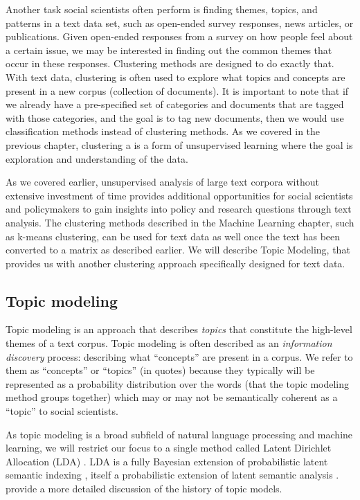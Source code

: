 \documentclass[]{krantz}
\begin{document}
Another task social scientists often perform is finding themes, topics,
and patterns in a text data set, such as open-ended survey responses,
news articles, or publications. Given open-ended responses from a survey
on how people feel about a certain issue, we may be interested in
finding out the common themes that occur in these responses. Clustering
methods are designed to do exactly that. With text data, clustering is
often used to explore what topics and concepts are present in a new
corpus (collection of documents). It is important to note that if we
already have a pre-specified set of categories and documents that are
tagged with those categories, and the goal is to tag new documents, then
we would use classification methods instead of clustering methods. As we
covered in the previous chapter, clustering a is a form of unsupervised
learning where the goal is exploration and understanding of the data.

As we covered earlier, unsupervised analysis of large text corpora
without extensive investment of time provides additional opportunities
for social scientists and policymakers to gain insights into policy and
research questions through text analysis. The clustering methods
described in the Machine Learning chapter, such as k-means clustering,
can be used for text data as well once the text has been converted to a
matrix as described earlier. We will describe Topic Modeling, that
provides us with another clustering approach specifically designed for
text data.

\subsection{Topic modeling}\label{sec:lda}

Topic modeling is an approach that describes \emph{topics} that
constitute the high-level themes of a text corpus. Topic modeling is
often described as an \emph{information discovery} process: describing
what ``concepts'' are present in a corpus. We refer to them as
``concepts'' or ``topics'' (in quotes) because they typically will be
represented as a probability distribution over the words (that the topic
modeling method groups together) which may or may not be semantically
coherent as a ``topic'' to social scientists.

As topic modeling is a broad subfield of natural language processing and
machine learning, we will restrict our focus to a single method called
Latent Dirichlet Allocation (LDA) \citep{blei-03}. LDA is a fully
Bayesian extension of probabilistic latent semantic indexing
\citep{hofmann-99}, itself a probabilistic extension of latent semantic
analysis \citep{landauer-97}. \citet{blei-09} provide a more detailed
discussion of the history of topic models.
\end{document}
